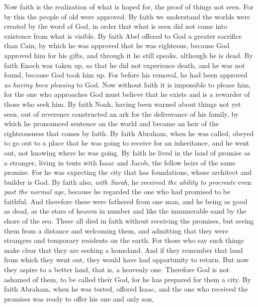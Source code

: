 \begin{biblechapter} %
 Now faith is the realization of what is hoped for, the proof of things not seen.
\verse For by this the people of old were approved.
\verse By faith we understand the worlds were created by the word of God, in order that what is seen did not come into existence from what is visible.
\verse By faith Abel offered to God a greater sacrifice than Cain, by which he was approved that he was righteous, because God approved him for his gifts, and through it he still speaks, although he is dead.
\verse By faith Enoch was taken up, so that he did not experience death, and he was not found, because God took him up. For before his removal, he had been approved \textit{as having been pleasing} to God.
\verse Now without faith it is impossible to please him, for the one who approaches God must believe that he exists and is a rewarder of those who seek him.
\verse By faith Noah, having been warned about things not yet seen, out of reverence constructed an ark for the deliverance of his family, by which he pronounced sentence on the world and became an heir of the righteousness that comes by faith.
\verse By faith Abraham, when he was called, obeyed to go out to a place that he was going to receive for an inheritance, and he went out, not knowing where he was going.
\verse By faith he lived in the land of promise as a stranger, living in tents with Isaac and Jacob, the fellow heirs of the same promise.
\verse For he was expecting the city that has foundations, whose architect and builder is God.
\verse By faith also, \textit{with Sarah}, he received \textit{the ability to procreate} even \textit{past the normal age}, because he regarded the one who had promised to be faithful.
\verse And therefore these were fathered from one man, and he being as good as dead, as the stars of heaven in number and like the innumerable sand by the shore of the sea.
\verse These all died in faith without receiving the promises, but seeing them from a distance and welcoming them, and admitting that they were strangers and temporary residents on the earth.
\verse For those who say such things make clear that they are seeking a homeland.
\verse And if they remember that land from which they went out, they would have had opportunity to return.
\verse But now they aspire to a better land, that is, a heavenly one. Therefore God is not ashamed of them, to be called their God, for he has prepared for them a city.
\verse By faith Abraham, when he was tested, offered Isaac, and the one who received the promises was ready to offer his one and only son,

\end{biblechapter}
